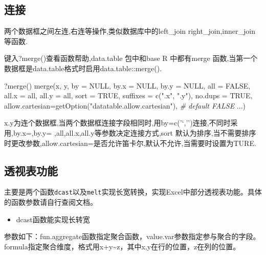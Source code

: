 \documentclass[
]{book}
\newenvironment{Shaded}{\begin{snugshade}}{\end{snugshade}}
\newcommand{\AttributeTok}[1]{\textcolor[rgb]{0.77,0.63,0.00}{#1}}
\newcommand{\CommentTok}[1]{\textcolor[rgb]{0.56,0.35,0.01}{\textit{#1}}}
\newcommand{\ConstantTok}[1]{\textcolor[rgb]{0.00,0.00,0.00}{#1}}
\newcommand{\FunctionTok}[1]{\textcolor[rgb]{0.00,0.00,0.00}{#1}}
\newcommand{\NormalTok}[1]{#1}
\newcommand{\StringTok}[1]{\textcolor[rgb]{0.31,0.60,0.02}{#1}}
\providecommand{\tightlist}{%
  \setlength{\itemsep}{0pt}\setlength{\parskip}{0pt}}
\begin{document}
\hypertarget{ux8fdeux63a5}{%
\subsection{连接}\label{ux8fdeux63a5}}

两个数据框之间左连,右连等操作,类似数据库中的left\_join right\_join,inner\_join 等函数.

键入?merge()查看函数帮助,data.table 包中和base R 中都有merge 函数,当第一个数据框是data.table格式时启用data.table::merge().

\begin{Shaded}
\begin{Highlighting}[]
\NormalTok{?}\FunctionTok{merge}\NormalTok{()}
\FunctionTok{merge}\NormalTok{(x, y, }\AttributeTok{by =} \ConstantTok{NULL}\NormalTok{, }\AttributeTok{by.x =} \ConstantTok{NULL}\NormalTok{, }\AttributeTok{by.y =} \ConstantTok{NULL}\NormalTok{, }\AttributeTok{all =} \ConstantTok{FALSE}\NormalTok{,}
\AttributeTok{all.x =}\NormalTok{ all, }\AttributeTok{all.y =}\NormalTok{ all, }\AttributeTok{sort =} \ConstantTok{TRUE}\NormalTok{, }\AttributeTok{suffixes =} \FunctionTok{c}\NormalTok{(}\StringTok{".x"}\NormalTok{, }\StringTok{".y"}\NormalTok{), }\AttributeTok{no.dups =} \ConstantTok{TRUE}\NormalTok{,}
\AttributeTok{allow.cartesian=}\FunctionTok{getOption}\NormalTok{(}\StringTok{"datatable.allow.cartesian"}\NormalTok{),  }\CommentTok{\# default FALSE}
\NormalTok{...)}
\end{Highlighting}
\end{Shaded}

x.y为连个数据框,当两个数据框连接字段相同时,用by=c('`,'')连接,不同时采用,by.x=,by.y= ,all,all.x,all.y等参数决定连接方式,sort 默认为排序,当不需要排序时更改参数,allow.cartesian=是否允许笛卡尔,默认不允许,当需要时设置为TURE.

\hypertarget{ux900fux89c6ux8868ux529fux80fd}{%
\subsection{透视表功能}\label{ux900fux89c6ux8868ux529fux80fd}}

主要是两个函数\texttt{dcast}以及\texttt{melt}实现长宽转换，实现Excel中部分透视表功能。具体的函数参数请自行查阅文档。

\begin{itemize}
\tightlist
\item
  dcast函数能实现长转宽
\end{itemize}

参数如下：fun.aggregate函数指定聚合函数，value.var参数指定参与聚合的字段。formula指定聚合维度，格式用x+y\textasciitilde z，其中x,y在行的位置，z在列的位置。
\end{document}
